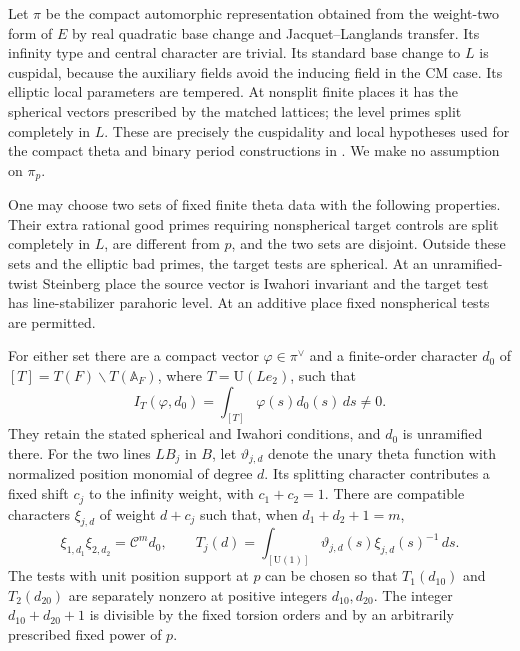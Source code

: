 Let $\pi$ be the compact automorphic representation obtained from the
weight-two form of $E$ by real quadratic base change and
Jacquet--Langlands transfer.  Its infinity type and central character
are trivial.  Its standard base change to $L$ is cuspidal, because the
auxiliary fields avoid the inducing field in the CM case.  Its
elliptic local parameters are tempered.  At nonsplit finite places it
has the spherical vectors prescribed by the matched lattices; the
level primes split completely in $L$.  These are precisely the
cuspidality and local hypotheses used for the compact theta and
binary period constructions in \cite[Sections 4--5]{C}.  We make no
assumption on $\pi_p$.

\begin{lemma}\label{theta:auxiliary-data}
One may choose two sets of fixed finite theta data with the following
properties.  Their extra rational good primes requiring nonspherical
target controls are split completely in $L$, are different from $p$,
and the two sets are disjoint.  Outside these sets and the elliptic
bad primes, the target tests are spherical.  At an unramified-twist
Steinberg place the source vector is Iwahori invariant and the target
test has line-stabilizer parahoric level.  At an additive place fixed
nonspherical tests are permitted.

For either set there are a compact vector $\varphi\in\pi^\vee$ and a
finite-order character $d_0$ of
$[T]=T(F)\backslash T(\mathbb A_F)$, where $T=\mathrm U(Le_2)$,
such that
\[
 I_T(\varphi,d_0)=\int_{[T]}\varphi(s)d_0(s)\,ds\ne0.
\]
They retain the stated spherical and Iwahori conditions, and $d_0$ is
unramified there.  For the two lines $LB_j$ in $B$, let
$\vartheta_{j,d}$ denote the unary theta function with normalized
position monomial of degree $d$.  Its splitting character contributes
a fixed shift $c_j$ to the infinity weight, with $c_1+c_2=1$.
There are compatible characters $\xi_{j,d}$ of weight $d+c_j$
such that, when $d_1+d_2+1=m$,
\[
 \xi_{1,d_1}\xi_{2,d_2}=\mathcal C^m d_0,\qquad
 T_j(d)=\int_{[\mathrm U(1)]}
          \vartheta_{j,d}(s)\xi_{j,d}(s)^{-1}\,ds.
\]
The tests with unit position support at $p$ can be chosen so that
$T_1(d_{10})$ and $T_2(d_{20})$ are separately nonzero at positive
integers $d_{10},d_{20}$.  The integer $d_{10}+d_{20}+1$ is divisible by the
fixed torsion orders and by an arbitrarily prescribed fixed power
of $p$.
\end{lemma}

